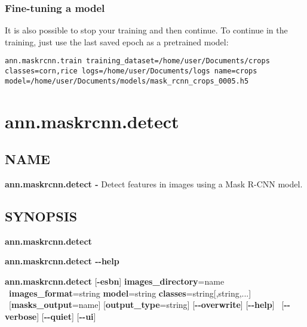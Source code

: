 \subsubsection*{Fine-tuning a model}
It is also possible to stop your training and then continue. To continue in the
training, just use the last saved epoch as a pretrained model:

\begin{lstlisting}[breaklines=true]
ann.maskrcnn.train training_dataset=/home/user/Documents/crops classes=corn,rice logs=/home/user/Documents/logs name=crops model=/home/user/Documents/models/mask_rcnn_crops_0005.h5
\end{lstlisting}

\clearpage

\section{ann.maskrcnn.detect}

\subsection*{NAME}

\textbf{ann.maskrcnn.detect -} Detect features in images using a Mask R-CNN model.

\subsection*{SYNOPSIS}

\begin{flushleft}
\textbf{ann.maskrcnn.detect} 

\textbf{ann.maskrcnn.detect -{}-help}

\textbf{ann.maskrcnn.detect} [\textbf{-esbn}] \textbf{images\_directory}=name \tab\ \textbf{images\_format}=string \textbf{model}=string \textbf{classes}=string[,string,...] \tab\ [\textbf{masks\_output}=name] [\textbf{output\_type}=string] [\textbf{-{}-overwrite}] [\textbf{-{}-help}] \tab\ [\textbf{-{}-verbose}] [\textbf{-{}-quiet}] [\textbf{-{}-ui}]
\end{flushleft}

